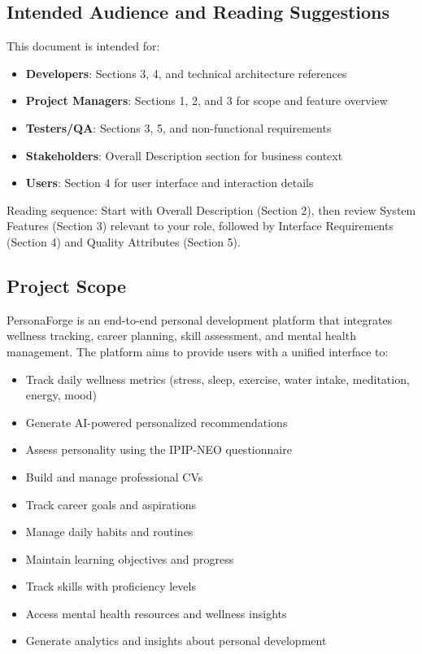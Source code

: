 \documentclass[12pt,a4paper]{article}
\begin{document}
\subsection{Intended Audience and Reading Suggestions}
This document is intended for:
\begin{itemize}
    \item \textbf{Developers}: Sections 3, 4, and technical architecture references
    \item \textbf{Project Managers}: Sections 1, 2, and 3 for scope and feature overview
    \item \textbf{Testers/QA}: Sections 3, 5, and non-functional requirements
    \item \textbf{Stakeholders}: Overall Description section for business context
    \item \textbf{Users}: Section 4 for user interface and interaction details
\end{itemize}

Reading sequence: Start with Overall Description (Section 2), then review System Features (Section 3) relevant to your role, followed by Interface Requirements (Section 4) and Quality Attributes (Section 5).

\subsection{Project Scope}
PersonaForge is an end-to-end personal development platform that integrates wellness tracking, career planning, skill assessment, and mental health management. The platform aims to provide users with a unified interface to:
\begin{itemize}
    \item Track daily wellness metrics (stress, sleep, exercise, water intake, meditation, energy, mood)
    \item Generate AI-powered personalized recommendations
    \item Assess personality using the IPIP-NEO questionnaire
    \item Build and manage professional CVs
    \item Track career goals and aspirations
    \item Manage daily habits and routines
    \item Maintain learning objectives and progress
    \item Track skills with proficiency levels
    \item Access mental health resources and wellness insights
    \item Generate analytics and insights about personal development
\end{itemize}
\end{document}
